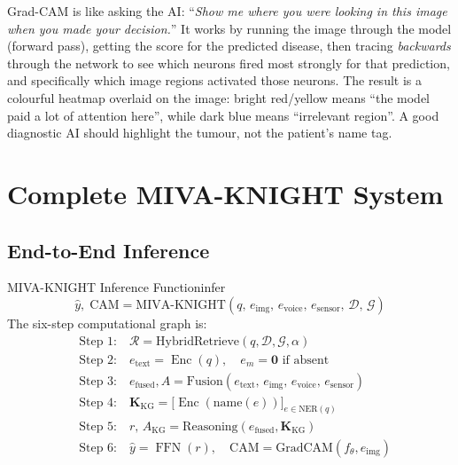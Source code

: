\documentclass[12pt,a4paper]{article}
\newenvironment{plainbox}[1]{%
  \begin{tcolorbox}[myplain,title={#1}]
}{%
  \end{tcolorbox}
}
\newcommand{\kg}{\mathcal{G}}
\newcommand{\Enc}{\operatorname{Enc}}
\newcommand{\FFN}{\operatorname{FFN}}
\newcommand{\efused}{e_{\text{fused}}}
\begin{document}
\begin{plainbox}{In Plain English}
Grad-CAM is like asking the AI: ``\emph{Show me where you were looking in this image
when you made your decision.}''
It works by running the image through the model (forward pass), getting the score for
the predicted disease, then tracing \emph{backwards} through the network to see which
neurons fired most strongly for that prediction, and specifically which image regions
activated those neurons.
The result is a colourful heatmap overlaid on the image: bright red/yellow means
``the model paid a lot of attention here'', while dark blue means ``irrelevant
region''. A good diagnostic AI should highlight the tumour, not the patient's name tag.
\end{plainbox}

\section{Complete MIVA-KNIGHT System}

\subsection{End-to-End Inference}

\begin{definition}{MIVA-KNIGHT Inference Function}{infer}
\[
  \hat{y},\;\text{CAM}
  = \text{MIVA-KNIGHT}(q,\, e_\text{img},\, e_\text{voice},\, e_\text{sensor},\,
    \mathcal{D},\, \kg)
\]
The six-step computational graph is:
\begin{align}
  &\text{Step 1:}\quad
    \mathcal{R} = \text{HybridRetrieve}(q, \mathcal{D}, \kg, \alpha)
    \label{step1}\\
  &\text{Step 2:}\quad
    e_\text{text} = \Enc(q), \quad
    e_m = \mathbf{0} \text{ if absent}
    \label{step2}\\
  &\text{Step 3:}\quad
    \efused, A = \text{Fusion}(e_\text{text},\, e_\text{img},\,
    e_\text{voice},\, e_\text{sensor})
    \label{step3}\\
  &\text{Step 4:}\quad
    \mathbf{K}_\text{KG} = \bigl[\Enc(\text{name}(e))\bigr]_{e \in \text{NER}(q)}
    \label{step4}\\
  &\text{Step 5:}\quad
    r,\, A_\text{KG} = \text{Reasoning}(\efused, \mathbf{K}_\text{KG})
    \label{step5}\\
  &\text{Step 6:}\quad
    \hat{y} = \FFN(r), \quad
    \text{CAM} = \text{GradCAM}(f_\theta, e_\text{img})
    \label{step6}
\end{align}
\end{definition}
\end{document}
